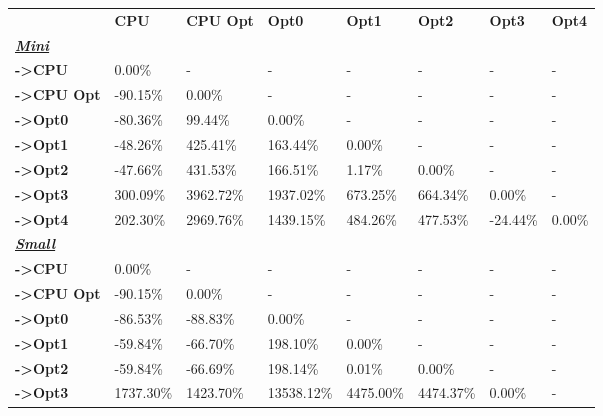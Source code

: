\begin{table}[H]
    \centering
    \begin{tabular}{llllllll}
    \rowcolor[HTML]{DAE8FC} \ &  \textbf{CPU} &  \textbf{CPU Opt} &  \textbf{Opt0} &  \textbf{Opt1} &  \textbf{Opt2} &  \textbf{Opt3} &  \textbf{Opt4} \\
    \cellcolor[HTML]{DAE8FC} \textbf{\textbf{{\emph{{\underline{{Mini}}}}}}} &  &  &  &  &  &  &  \\
    \rowcolor[HTML]{EFEFEF} \cellcolor[HTML]{DAE8FC} \textbf{->CPU} & 0.00\% & - & - & - & - & - & - \\
    \cellcolor[HTML]{DAE8FC} \textbf{->CPU Opt} & -90.15\% & 0.00\% & - & - & - & - & - \\
    \rowcolor[HTML]{EFEFEF} \cellcolor[HTML]{DAE8FC} \textbf{->Opt0} & -80.36\% & 99.44\% & 0.00\% & - & - & - & - \\
    \cellcolor[HTML]{DAE8FC} \textbf{->Opt1} & -48.26\% & 425.41\% & 163.44\% & 0.00\% & - & - & - \\
    \rowcolor[HTML]{EFEFEF} \cellcolor[HTML]{DAE8FC} \textbf{->Opt2} & -47.66\% & 431.53\% & 166.51\% & 1.17\% & 0.00\% & - & - \\
    \cellcolor[HTML]{DAE8FC} \textbf{->Opt3} & 300.09\% & 3962.72\% & 1937.02\% & 673.25\% & 664.34\% & 	0.00\% & - \\
    \rowcolor[HTML]{EFEFEF} \cellcolor[HTML]{DAE8FC} \textbf{->Opt4} & 202.30\% & 2969.76\% & 1439.15\% & 484.26\% & 477.53\% & 	-24.44\% & 	0.00\% \\
    \cellcolor[HTML]{DAE8FC} \textbf{\textbf{{\emph{{\underline{{Small}}}}}}} &  &  &  &  &  &  &  \\
    \rowcolor[HTML]{EFEFEF} \cellcolor[HTML]{DAE8FC} \textbf{->CPU} & 0.00\% & - & - & - & - & - & - \\
    \cellcolor[HTML]{DAE8FC} \textbf{->CPU Opt} & -90.15\% & 0.00\% & - & - & - & - & - \\
    \rowcolor[HTML]{EFEFEF} \cellcolor[HTML]{DAE8FC} \textbf{->Opt0} & -86.53\% & -88.83\% & 0.00\% & - & - & - & - \\
    \cellcolor[HTML]{DAE8FC} \textbf{->Opt1} & -59.84\% & -66.70\% & 198.10\% & 0.00\% & - & - & - \\
    \rowcolor[HTML]{EFEFEF} \cellcolor[HTML]{DAE8FC} \textbf{->Opt2} & -59.84\% & -66.69\% & 198.14\% & 0.01\% & 0.00\% & - & - \\
    \cellcolor[HTML]{DAE8FC} \textbf{->Opt3} & 1737.30\% & 1423.70\% & 13538.12\% & 4475.00\% & 4474.37\% & 	0.00\% & - \\

\end{tabular}
\end{table}

